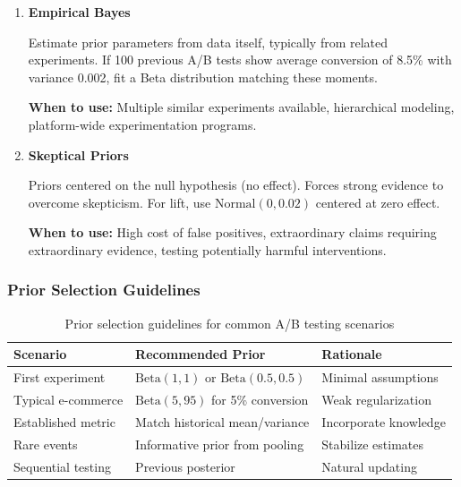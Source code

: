 \begin{enumerate}
    \textbf{When to use:} Extensive historical data exists, testing rare events requiring stabilization, sequential experiments where previous posteriors become new priors.

    \item \textbf{Empirical Bayes}

    Estimate prior parameters from data itself, typically from related experiments. If 100 previous A/B tests show average conversion of 8.5\% with variance 0.002, fit a Beta distribution matching these moments.

    \textbf{When to use:} Multiple similar experiments available, hierarchical modeling, platform-wide experimentation programs.

    \item \textbf{Skeptical Priors}

    Priors centered on the null hypothesis (no effect). Forces strong evidence to overcome skepticism. For lift, use $\text{Normal}(0, 0.02)$ centered at zero effect.

    \textbf{When to use:} High cost of false positives, extraordinary claims requiring extraordinary evidence, testing potentially harmful interventions.
\end{enumerate}

\subsubsection{Prior Selection Guidelines}

\begin{table}[h]
\centering
\begin{tabular}{lll}
\toprule
\textbf{Scenario} & \textbf{Recommended Prior} & \textbf{Rationale} \\
\midrule
First experiment & $\text{Beta}(1, 1)$ or $\text{Beta}(0.5, 0.5)$ & Minimal assumptions \\
Typical e-commerce & $\text{Beta}(5, 95)$ for 5\% conversion & Weak regularization \\
Established metric & Match historical mean/variance & Incorporate knowledge \\
Rare events & Informative prior from pooling & Stabilize estimates \\
Sequential testing & Previous posterior & Natural updating \\
\bottomrule
\end{tabular}
\caption{Prior selection guidelines for common A/B testing scenarios}
\label{tab:prior_selection}
\end{table}

